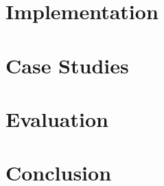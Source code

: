 \documentclass[11pt,twoside,final]{mitthesis}
\begin{document}
\chapter{Implementation}%
\label{ch:impl}


\chapter{Case Studies}%
\label{ch:case_studies}


\chapter{Evaluation}%
\label{ch:eval}


\chapter{Conclusion}%
\label{ch:conclusion}



\begin{spacing}{1}
{}

\end{spacing}
\end{document}
